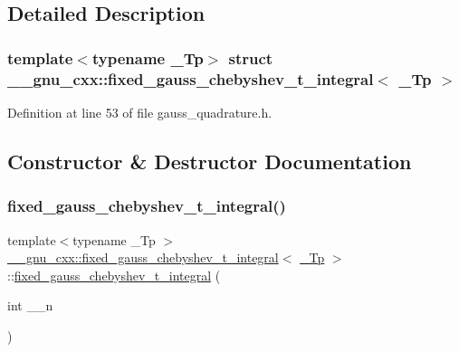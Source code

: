 \subsection{Detailed Description}
\subsubsection*{template$<$typename \+\_\+\+Tp$>$\newline
struct \+\_\+\+\_\+gnu\+\_\+cxx\+::fixed\+\_\+gauss\+\_\+chebyshev\+\_\+t\+\_\+integral$<$ \+\_\+\+Tp $>$}



Definition at line 53 of file gauss\+\_\+quadrature.\+h.



\subsection{Constructor \& Destructor Documentation}
\mbox{\label{struct____gnu__cxx_1_1fixed__gauss__chebyshev__t__integral_a681b1b368ba8b72a8043442f4c25f980}} 
\subsubsection{\texorpdfstring{fixed\+\_\+gauss\+\_\+chebyshev\+\_\+t\+\_\+integral()}{fixed\_gauss\_chebyshev\_t\_integral()}}
{\footnotesize\ttfamily template$<$typename \+\_\+\+Tp $>$ \\
\hyperlink{struct____gnu__cxx_1_1fixed__gauss__chebyshev__t__integral}{\+\_\+\+\_\+gnu\+\_\+cxx\+::fixed\+\_\+gauss\+\_\+chebyshev\+\_\+t\+\_\+integral}$<$ \hyperlink{namespace____gnu__cxx_a3b19a9c800ca194374ef9172290f7d79}{\+\_\+\+Tp} $>$\+::\hyperlink{struct____gnu__cxx_1_1fixed__gauss__chebyshev__t__integral}{fixed\+\_\+gauss\+\_\+chebyshev\+\_\+t\+\_\+integral} (\begin{DoxyParamCaption}\item[{int}]{\+\_\+\+\_\+n }\end{DoxyParamCaption})\hspace{0.3cm}{\ttfamily [explicit]}}

